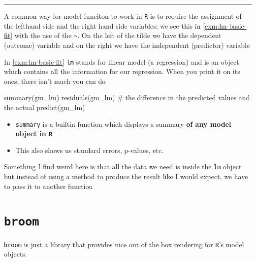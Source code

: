 \documentclass[
]{report}
\newenvironment{Shaded}{\begin{snugshade}}{\end{snugshade}}
\newcommand{\CommentTok}[1]{\textcolor[rgb]{0.50,0.62,0.50}{#1}}
\newcommand{\FunctionTok}[1]{\textcolor[rgb]{0.94,0.94,0.56}{#1}}
\newcommand{\NormalTok}[1]{\textcolor[rgb]{0.80,0.80,0.80}{#1}}
\providecommand{\tightlist}{%
  \setlength{\itemsep}{0pt}\setlength{\parskip}{0pt}}
\renewenvironment{quote}{
	\bigskip\begin{mdframed}[
			skipabove=\topskip,
			skipbelow=\topskip,
			backgroundcolor=quoteshadecolor,
			leftmargin=0.5cm,
			rightmargin=0.5cm,
			topline=false,
			rightline=false,
			bottomline=false,
			nobreak=true,
		]\itshape%
		}{
	\end{mdframed}
}
\renewenvironment{Shaded}{
	\bigskip
	\begin{tcolorbox}[drop fuzzy midday shadow]
		\begin{mdframed}[
				skipabove=\topskip*2,
				outerlinewidth= 0,
				linewidth=0pt,
				roundcorner= 3pt,
				backgroundcolor= shadecolor,
				outerlinecolor= shadecolor,
				innertopmargin= \topskip,
				innerbottommargin=\topskip,
				leftmargin=-0.8cm,
				rightmargin=-0.8cm
			]}{
		\end{mdframed}
	\end{tcolorbox}
	\smallskip
}
\theoremstyle{definition}
\theoremstyle{definition}
\theoremstyle{definition}
\theoremstyle{definition}
\theoremstyle{remark}
\begin{document}
\begin{center}\rule{0.5\linewidth}{0.5pt}\end{center}

\begin{quote}
A common way for model funciton to work in \texttt{R} is to require the assignment
of the lefthand side and the right hand side variables; we see this in
\ref{exm:lm-basic-fit} with the use of the \texttt{\textasciitilde{}}. On the left of the tilde we
have the dependent (outcome) variable and on the right we have the
independent (predictor) variable
\end{quote}

In \ref{exm:lm-basic-fit} \texttt{lm} stands for linear model (a regression) and is
an object which contains all the information for our regression. When you print
it on its ones, there isn't much you can do

\begin{Shaded}
\begin{Highlighting}[numbers=left,,]
\FunctionTok{summary}\NormalTok{(gm\_lm)}
\FunctionTok{residuals}\NormalTok{(gm\_lm) }\CommentTok{\# the difference in the predicted values and the actual}
\FunctionTok{predict}\NormalTok{(gm\_lm)}
\end{Highlighting}
\end{Shaded}

\begin{itemize}
\tightlist
\item
  \texttt{summary} is a builtin function which displays a summary \textbf{of any model
  object in \texttt{R}}
\item
  This also shows us standard errors, p-values, etc.
\end{itemize}

\begin{quote}
Something I find weird here is that all the data we need is inside the \texttt{lm}
object but instead of using a method to produce the result like I would
expect, we have to pass it to another function
\end{quote}

\hypertarget{broom}{%
\section{\texorpdfstring{\texttt{broom}}{broom}}\label{broom}}

\texttt{broom} is just a library that provides nice out of the box rendering for \texttt{R}'s
model objects.
\end{document}
